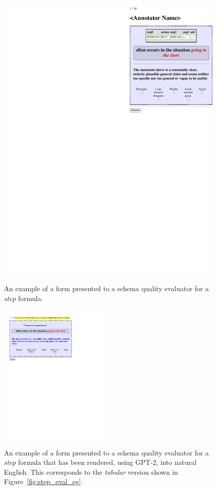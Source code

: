 \begin{figure}
\begin{minipage}[t][.4\textheight]{.4\columnwidth}
    \includegraphics[width=\textwidth]{CH4_learning/evaleg3.pdf}
    \caption{An example of a form presented to a schema quality evaluator for a \textit{step} formula.}
    \label{fig:step_eval_eg}
\end{minipage}
\begin{minipage}[b][.5\textheight]{0.8\columnwidth}
    \centering
    \includegraphics[width=0.5\textwidth]{CH5_eval/gpteval}
    \caption{An example of a form presented to a schema quality evaluator for a \textit{step} formula that has been rendered, using GPT-2, into natural English. This corresponds to the \textit{tabular} version shown in Figure~\ref{fig:step_eval_eg}.}
    \label{fig:gpt_step_eval_eg}
\end{minipage}

\end{figure}


\begin{figure}
    \centering

\end{figure}